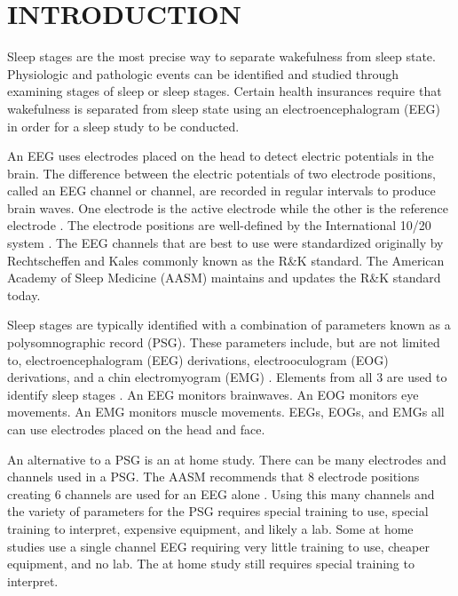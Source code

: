 \documentclass[12pt, oneside]{book}
\renewcommand*\listfigurename{LIST OF FIGURES}
\begin{document}
\renewcommand\listfigurename{\textnormal{LIST OF FIGURES}}
\addcontentsline{toc}{chapter}{\listfigurename}
\listoffigures
\clearpage

\newpage
{} %
\pagestyle{fancy}
\lhead{} \chead{} \rhead{\normalsize\thepage} %
\lfoot{} \cfoot{} \rfoot{}
\renewcommand{\headrulewidth}{0pt}
\renewcommand{\footrulewidth}{0pt}

\chapter{\textbf{INTRODUCTION}}
Sleep stages are the most precise way to separate wakefulness from sleep state. Physiologic and pathologic events can be identified and studied through examining stages of sleep or sleep stages. Certain health insurances require that wakefulness is separated from sleep state using an electroencephalogram (EEG) in order for a sleep study to be conducted. 

An EEG uses electrodes placed on the head to detect electric potentials in the brain. The difference between the electric potentials of two electrode positions, called an EEG channel or channel, are recorded in regular intervals to produce brain waves. One electrode is the active electrode while the other is the reference electrode \cite{berry_md_chair_aasm_nodate}. The electrode positions are well-defined by the International 10/20 system \cite{berry_md_chair_aasm_nodate} \cite{noauthor_10/20_nodate-1} \cite{noauthor_10/20_nodate}. The EEG channels that are best to use were standardized originally by Rechtscheffen and Kales \cite{rechtschaffen_manual_nodate} commonly known as the R\&K standard. The American Academy of Sleep Medicine (AASM) maintains and updates the R\&K standard today.

Sleep stages are typically identified with a combination of parameters known as a polysomnographic record (PSG). These parameters include, but are not limited to, electroencephalogram (EEG) derivations, electrooculogram (EOG) derivations, and a chin electromyogram (EMG) \cite{berry_md_chair_aasm_nodate}. Elements from all 3 are used to identify sleep stages \cite{berry_md_chair_aasm_nodate}. An EEG monitors brainwaves. An EOG monitors eye movements. An EMG monitors muscle movements. EEGs, EOGs, and EMGs all can use electrodes placed on the head and face. 

An alternative to a PSG is an at home study. There can be many electrodes and channels used in a PSG. The AASM recommends that 8 electrode positions creating 6 channels are used for an EEG alone \cite{berry_md_chair_aasm_nodate}. Using this many channels and the variety of parameters for the PSG requires special training to use, special training to interpret, expensive equipment, and likely a lab. Some at home studies use a single channel EEG requiring very little training to use, cheaper equipment, and no lab. The at home study still requires special training to interpret.
\end{document}
